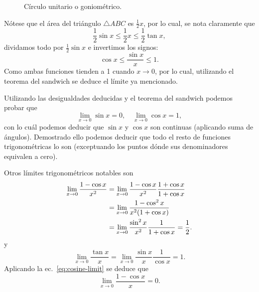 \documentclass[11pt,oneside,a4paper]{book}
\begin{document}
\begin{figure}
\centering
{}
\caption{Círculo unitario o goniométrico.}
\end{figure}

Nótese que el área del triángulo $\triangle ABC$ es $\frac{1}{2}x$, por lo cual, se nota claramente que
$$\frac{1}{2}\sin x\leq\frac{1}{2}x\leq\frac{1}{2}\tan x,$$
dividamos todo por $\frac{1}{2}\sin x$ e invertimos los signos:
$$\cos x\leq\frac{\sin x}{x}\leq 1.$$
Como ambas funciones tienden a 1 cuando $x\to 0$, por lo cual, utilizando el teorema del sandwich se deduce el límite ya mencionado.

Utilizando las desigualdades deducidas y el teorema del sandwich podemos probar que
$$\lim_{x\to 0}\sin x=0,\quad\lim_{x\to 0}\cos x=1,$$
con lo cuál podemos deducir que $\sin x$ y $\cos x$ son continuas (aplicando suma de ángulos). Demostrado ello podemos deducir que todo el resto de funciones trigonométricas lo son (exceptuando los puntos dónde sus denominadores equivalen a cero).

Otros límites trigonométricos notables son
\begin{align}
\lim_{x\to 0}\frac{1-\cos x}{x^2}&=\lim_{x\to 0}\frac{1-\cos x}{x^2}\frac{1+\cos x}{1+\cos x}\notag\\
&=\lim_{x\to 0}\frac{1-\cos^2 x}{x^2(1+\cos x)}\notag\\
&=\lim_{x\to 0}\frac{\sin^2 x}{x^2}\frac{1}{1+\cos x}=\frac 12.\label{eq:cosine-limit}
\end{align}
y
\begin{equation}
\lim_{x\to 0}\frac{\tan x}{x}=\lim_{x\to 0}\frac{\sin x}{x}\frac{1}{\cos x}=1.
\end{equation}
Aplicando la ec.~\ref{eq:cosine-limit} se deduce que
$$\lim_{x\to 0}\frac{1-\cos x}{x}=0.$$
\end{document}
